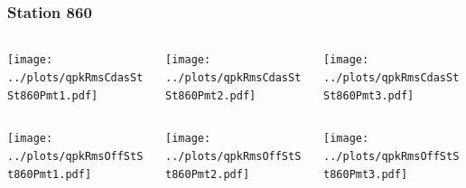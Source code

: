 \documentclass[aspectratio=169]{beamer}
\begin{document}
\begin{frame} 
  \frametitle{Station 860}
  \begin{center}
    \begin{columns}
      \begin{column}{0.33\textwidth}
        \texttt{[image: ../plots/qpkRmsCdasStSt860Pmt1.pdf]}
      \end{column}
      \begin{column}{0.33\textwidth}
        \texttt{[image: ../plots/qpkRmsCdasStSt860Pmt2.pdf]}
      \end{column}
      \begin{column}{0.33\textwidth}
        \texttt{[image: ../plots/qpkRmsCdasStSt860Pmt3.pdf]}
      \end{column}
    \end{columns}
  \end{center}

  \begin{center}
    \begin{columns}
      \begin{column}{0.33\textwidth}
        \texttt{[image: ../plots/qpkRmsOffStSt860Pmt1.pdf]}
      \end{column}
      \begin{column}{0.33\textwidth}
        \texttt{[image: ../plots/qpkRmsOffStSt860Pmt2.pdf]}
      \end{column}
      \begin{column}{0.33\textwidth}
        \texttt{[image: ../plots/qpkRmsOffStSt860Pmt3.pdf]}
      \end{column}
    \end{columns}
  \end{center}
\end{frame}
\end{document}
